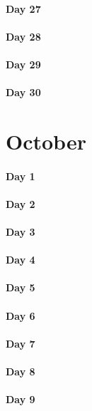 \documentclass[UTF8,a4paper,8pt]{ctexart}
\begin{document}
 	 \paragraph{Day 27      \quad     }
 	 \paragraph{Day 28      \quad     }
 	 \paragraph{Day 29      \quad     }   
 	 \paragraph{Day 30      \quad     }
\section{October}
 	 \paragraph{Day 1       \quad     }
 	 \paragraph{Day 2       \quad     }
 	 \paragraph{Day 3       \quad     }
 	 \paragraph{Day 4       \quad     }
 	 \paragraph{Day 5       \quad     }
 	 \paragraph{Day 6       \quad     }
 	 \paragraph{Day 7       \quad     }
 	 \paragraph{Day 8       \quad     }
 	 \paragraph{Day 9       \quad     }
\end{document}
